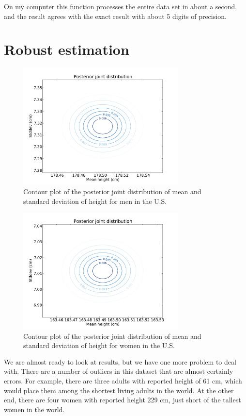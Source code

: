 \documentclass[12pt]{book}
\begin{document}
On my computer this function processes the entire data set in about a
second, and the result agrees with the exact result with about 5
digits of precision.


\section{Robust estimation}

\begin{figure}
\centerline{\includegraphics[height=2.5in]{figs/variability_posterior_male.pdf}}
\caption{Contour plot of the posterior joint distribution of
mean and standard deviation of height for men in the U.S.}
\label{fig.variability1}
\end{figure}

\begin{figure}
\centerline{\includegraphics[height=2.5in]{figs/variability_posterior_female.pdf}}
\caption{Contour plot of the posterior joint distribution of
mean and standard deviation of height for women in the U.S.}
\label{fig.variability2}
\end{figure}

We are almost ready to look at results, but we have one more
problem to deal with.  There are a number of outliers in this
dataset that are almost certainly errors.  For example, there
are three adults with reported height of 61 cm, which would
place them among the shortest living adults in the world.
At the other end, there are four women with reported height
229 cm, just short of the tallest women in the world.
\end{document}
